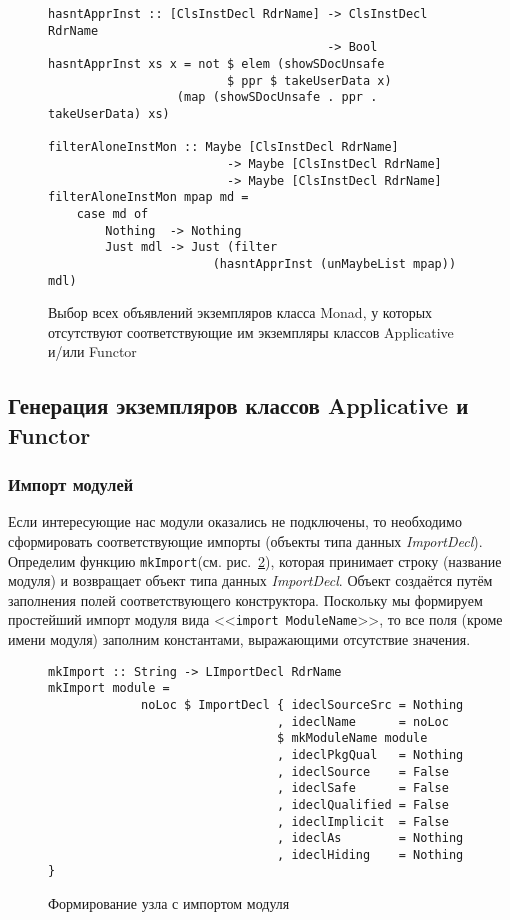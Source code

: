 \begin{figure}[htb]
\hrulefill
\begin{lstlisting}
hasntApprInst :: [ClsInstDecl RdrName] -> ClsInstDecl RdrName
                                       -> Bool
hasntApprInst xs x = not $ elem (showSDocUnsafe 
                         $ ppr $ takeUserData x) 
                  (map (showSDocUnsafe . ppr . takeUserData) xs)

filterAloneInstMon :: Maybe [ClsInstDecl RdrName]
                         -> Maybe [ClsInstDecl RdrName]
                         -> Maybe [ClsInstDecl RdrName]
filterAloneInstMon mpap md = 
    case md of
        Nothing  -> Nothing
        Just mdl -> Just (filter 
                       (hasntApprInst (unMaybeList mpap)) mdl)
\end{lstlisting}
\hrulefill
\caption{Выбор всех объявлений экземпляров класса Monad, у которых отсутствуют соответствующие им экземпляры классов Applicative и/или Functor}\label{p6}
\end{figure}
\subsection{Генерация экземпляров классов Applicative и
Functor}
\subsubsection{Импорт модулей}
Если интересующие нас модули оказались не подключены, то необходимо сформировать соответствующие импорты (объекты типа данных \textit{ImportDecl}). Определим функцию \lstinline{mkImport}(см. рис.~\ref{imp}), которая принимает строку (название модуля) и возвращает объект типа данных \textit{ImportDecl}. Объект создаётся путём заполнения полей соответствующего конструктора. Поскольку мы формируем простейший импорт модуля вида <<\lstinline{import ModuleName}>>, то все поля (кроме имени модуля) заполним константами, выражающими отсутствие значения.

\begin{figure}[h]
\hrulefill
\begin{lstlisting}
mkImport :: String -> LImportDecl RdrName
mkImport module = 
             noLoc $ ImportDecl { ideclSourceSrc = Nothing
                                , ideclName      = noLoc 
                                $ mkModuleName module
                                , ideclPkgQual   = Nothing
                                , ideclSource    = False
                                , ideclSafe      = False
                                , ideclQualified = False
                                , ideclImplicit  = False
                                , ideclAs        = Nothing
                                , ideclHiding    = Nothing }
\end{lstlisting}
\hrulefill
\caption{Формирование узла с импортом модуля}\label{imp}
\end{figure}

